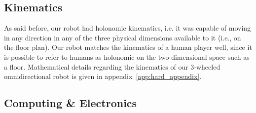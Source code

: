 \subsection{Kinematics}
As said before, our robot had holonomic kinematics, i.e. it was capable of moving in any direction in any of the three physical dimensions available to it (i.e., on the floor plan). Our robot matches the kinematics of a human player well, since it is possible to refer to humans as holonomic on the two-dimensional space such as a floor. Mathematical details regarding the kinematics of our 3-wheeled omnidirectional robot is given in appendix~\ref{app:hard_appendix}.


\subsection{Computing \& Electronics}

